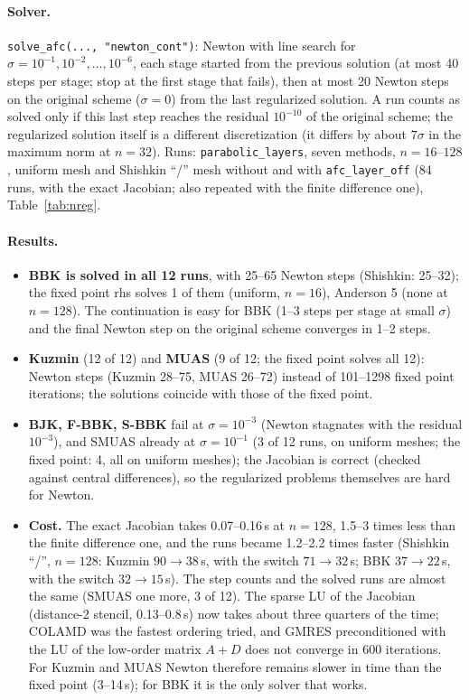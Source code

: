 \documentclass[11pt]{article}
\begin{document}
\paragraph{Solver.} \texttt{solve\_afc(..., "newton\_cont")}: Newton with line search for
$\sigma=10^{-1},10^{-2},\dots,10^{-6}$, each stage started from the previous solution (at most 40 steps per stage;
stop at the first stage that fails), then at most 20 Newton steps on the original scheme ($\sigma=0$) from the last
regularized solution. A run counts as solved only if this last step reaches the residual $10^{-10}$ of the original
scheme; the regularized solution itself is a different discretization (it differs by about $7\sigma$ in the maximum
norm at $n=32$). Runs: \texttt{parabolic\_layers}, seven methods, $n=16$--$128$, uniform mesh and Shishkin ``/'' mesh
without and with \texttt{afc\_layer\_off} (84 runs, with the exact Jacobian; also repeated with the finite difference
one), Table~\ref{tab:nreg}.



\paragraph{Results.}
\begin{itemize}[leftmargin=*]
\item \textbf{BBK is solved in all 12 runs}, with 25--65 Newton steps (Shishkin: 25--32); the fixed point rhs solves 1
  of them (uniform, $n=16$), Anderson 5 (none at $n=128$). The continuation is easy for BBK (1--3 steps
  per stage at small $\sigma$) and the final Newton step on the original scheme converges in 1--2 steps.
\item \textbf{Kuzmin} (12 of 12) and \textbf{MUAS} (9 of 12; the fixed point solves all 12): Newton steps
  (Kuzmin 28--75, MUAS 26--72) instead of 101--1298 fixed point iterations; the solutions coincide with those of the fixed point.
\item \textbf{BJK, F-BBK, S-BBK} fail at $\sigma=10^{-3}$ (Newton stagnates with the residual $10^{-3}$), and SMUAS
  already at $\sigma=10^{-1}$ (3 of 12 runs, on uniform meshes; the fixed point: 4, all on uniform meshes); the Jacobian is correct (checked against central
  differences), so the regularized problems themselves are hard for Newton.
\item \textbf{Cost.} The exact Jacobian takes 0.07--0.16\,s at $n=128$, 1.5--3 times less than the finite difference
  one, and the runs became 1.2--2.2 times faster (Shishkin ``/'', $n=128$: Kuzmin $90\to38$\,s, with the switch
  $71\to32$\,s; BBK $37\to22$\,s, with the switch $32\to15$\,s). The step counts and the solved runs are almost the
  same (SMUAS one more, 3 of 12). The sparse LU of the Jacobian (distance-2 stencil, 0.13--0.8\,s) now takes about
  three quarters of the time; COLAMD was the fastest ordering tried, and GMRES preconditioned with the LU of the
  low-order matrix $A+D$ does not converge in 600 iterations. For Kuzmin and MUAS Newton therefore remains slower in
  time than the fixed point (3--14\,s); for BBK it is the only solver that works.
\end{itemize}
\end{document}
